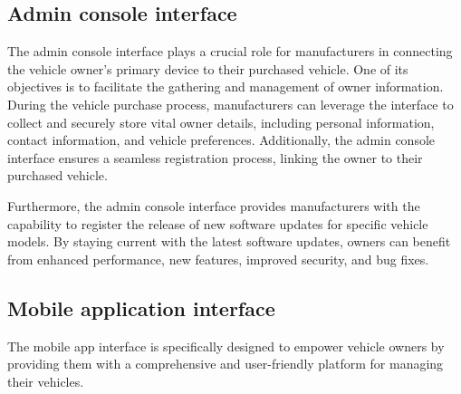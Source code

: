 \documentclass[
12pt,
oneside, 
onehalfspacing, 
nolistspacing, 
parskip, 
chapterinoneline, 
]{AASTCOMPUTER}
\begin{document}
\subsection{Admin console interface}
The admin console interface plays a crucial role for manufacturers in connecting the vehicle owner's primary device to their purchased vehicle. One of its objectives is to facilitate the gathering and management of owner information. During the vehicle purchase process, manufacturers can leverage the interface to collect and securely store vital owner details, including personal information, contact information, and vehicle preferences. Additionally, the admin console interface ensures a seamless registration process, linking the owner to their purchased vehicle.

Furthermore, the admin console interface provides manufacturers with the capability to register the release of new software updates for specific vehicle models. By staying current with the latest software updates, owners can benefit from enhanced performance, new features, improved security, and bug fixes.

\subsection{Mobile application interface}
The mobile app interface is specifically designed to empower vehicle owners by providing them with a comprehensive and user-friendly platform for managing their vehicles. 
\end{document}
